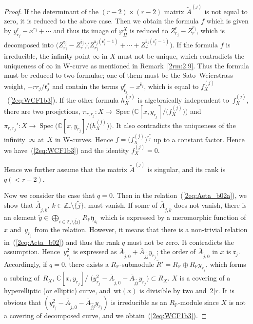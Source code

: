 \documentclass[pdftex]{sigma}
\def\CC{{\mathbb C}}
\def\ZZ{{\mathbb Z}}
\def\PP{{\mathbb P}}
\def\fe{{\mathfrak e}}
\def\fr{{\mathfrak r}}
\def\fy{{\mathfrak y}}
\def\tA{{\widetilde A}}
\def\tR{{\widetilde R}}
\def\tR{{\widetilde R}}
\def\tj{{\widetilde j}}
\def\ty{{\widetilde y}}
\def\BA{{\overline A}}
\def\Bfr{{\overline{\mathfrak r}}}
\def\Spec{\operatorname{Spec}}
\def\wt{{\mathrm {wt}}}
\numberwithin{equation}{section}
\begin{document}
\begin{proof}
If the determinant of the $(r-2)\times (r-2)$ matrix $\tA^{(j)}$ is not equal to zero, it is reduced to the above case.
Then we obtain the formula $f$ which is given by $y_{r_j}^r - x^{r_j} + \cdots$ and thus its image of $\varphi_H^X$ is reduced to $Z_{r_j}^r - Z_r^{r_j}$, which is decomposed into $\big(Z_{r_j}^{\fr_j} - Z_r^{\Bfr_j}\big)\big(Z_{r_j}^{\fr_j(\fr_j^*-1)}+\cdots+ Z_r^{\Bfr_j(\fr_j^*-1)}\big)$.
If the formula $f$ is irreducible, the infinity point $\infty$ in $X$ must not be unique, which contradicts the uniqueness of $\infty$ in W-curve as mentioned in Remark~\ref{2rm:2.9}.
Thus the formula must be reduced to two formulae; one of them must be the Sato--Weierstrass weight, $-r r_j/\fr_j^*$ and contain the terms $y_{\fr_j}^r - x^{\Bfr_j}$, which is equal to $f_X^{(j)}$~(\ref{2eq:WCF1b3}).
If the other formula $h_X^{(j)}$ is algebraically independent to~$f_X^{(j)}$, there are two proejctions, $\pi_{r, r_j}\colon X\to \Spec \big(\CC[x,y_{r_j}]/\big(f_X^{(j)}\big)\big)$ and $\pi_{r, r_j}'\colon X\to \Spec \big(\CC[x,y_{r_j}]/\big(h_X^{(j)}\big)\big)$.
It also contradicts the uniqueness of the infinity~$\infty$ at~$X$ in W-curves. Hence $f=\big(f_X^{(j)}\big)^{\fr_j^*}$ up to a constant factor. Hence we have~(\ref{2eq:WCF1b3}) and the identity $f_X^{(j)}=0$.

Hence we further assume that the matrix $\tA^{(j)}$ is singular, and its rank is $q(<r-2)$.

Now we consider the case that $q=0$.
Then in the relation~(\ref{2eq:Aeta_b02a}), we show that $\BA_{\tj,k}$, $k\in \ZZ_r\setminus\big\{\tj\big\}$, must vanish.
If some of $\BA_{\tj,k}$ does not vanish, there is an element $\ty \in \bigoplus_{i \in \ZZ_r\setminus\{\tj\}}R_\PP \fy_{\fe_i}$ which is expressed by a meromorphic function of~$x$ and~$y_{r_j}$ from the relation.
However, it means that there is a non-trivial relation in~(\ref{2eq:Aeta_b02}) and thus the rank $q$ must not be zero. It contradicts the assumption.
Hence~$y_{r_j}^2$ is expressed as $\BA_{\tj,0}+\BA_{\tj\tj}y_{r_j}$; the order of $\BA_{\tj,0}$ in $x$ is $\Bfr_j$.
Accordingly, if $q = 0$, there exists a $R_\PP$-submodule $\tR'=R_\PP \oplus R_\PP y_{r_j}$, which forms a subring of~$R_X$, $\CC[x, y_{r_j}]/$ $\big(y_{r_j}^2-\BA_{\tj,0}-\BA_{\tj\tj}y_{r_j}\big)\subset R_X$.
$X$ is a covering of a hyperelliptic (or elliptic) curve, and~$\wt(x)$ is divisible by two and~$2|r$.
It is obvious that $(y_{r_j}^2-\BA_{\tj,0}-\BA_{\tj\tj}y_{r_j})$ is irreducible as an $R_\PP$-module since $X$ is not a covering of decomposed curve, and we obtain~(\ref{2eq:WCF1b3}).


\end{proof}
\end{document}
